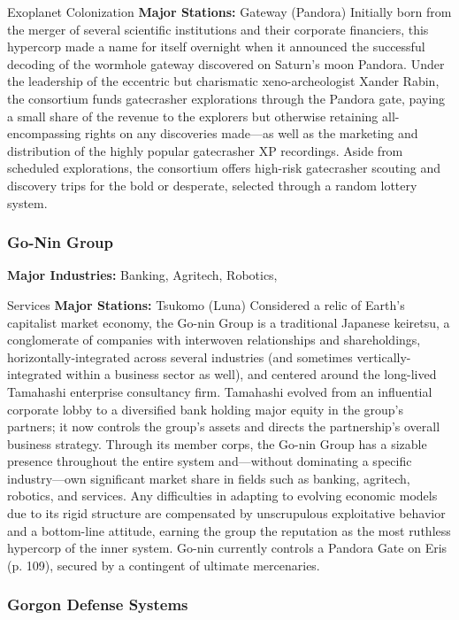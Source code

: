 Exoplanet Colonization
\textbf{Major Stations:} Gateway (Pandora)
Initially born from the merger of several scientific 
institutions and their corporate financiers, this hypercorp
made a name for itself overnight when it
announced the successful decoding of the wormhole 
gateway discovered on Saturn's moon Pandora. Under 
the leadership of the eccentric but charismatic xeno-archeologist
Xander Rabin, the consortium funds
gatecrasher explorations through the Pandora gate, 
paying a small share of the revenue to the explorers 
but otherwise retaining all-encompassing rights on 
any discoveries made—as well as the marketing and 
distribution of the highly popular gatecrasher XP 
recordings. Aside from scheduled explorations, the 
consortium offers high-risk gatecrasher scouting and 
discovery trips for the bold or desperate, selected 
through a random lottery system.

\subsubsection{Go-Nin Group}

\textbf{Major Industries:} Banking, Agritech, Robotics, 

Services
\textbf{Major Stations:} Tsukomo (Luna)
Considered a relic of Earth's capitalist market 
economy, the Go-nin Group is a traditional Japanese 
keiretsu, a conglomerate of companies with interwoven
relationships and shareholdings, horizontally-integrated
across several industries (and sometimes
vertically-integrated within a business sector as well), 
and centered around the long-lived Tamahashi enterprise
consultancy firm. Tamahashi evolved from
an influential corporate lobby to a diversified  bank 
holding major equity in the group's partners; it now 
controls the group's assets and directs the partnership's 
overall business strategy. Through its member corps, 
the Go-nin Group has a sizable presence throughout 
the entire system and—without dominating a specific 
industry—own significant market share in fields such 
as banking, agritech, robotics, and services. Any difficulties
in adapting to evolving economic models due
to its rigid structure are compensated by unscrupulous 
exploitative behavior and a bottom-line attitude, 
earning the group the reputation as the most ruthless 
hypercorp of the inner system. Go-nin currently controls
a Pandora Gate on Eris (p. 109), secured by a
contingent of ultimate mercenaries.

\subsubsection{Gorgon Defense Systems}

